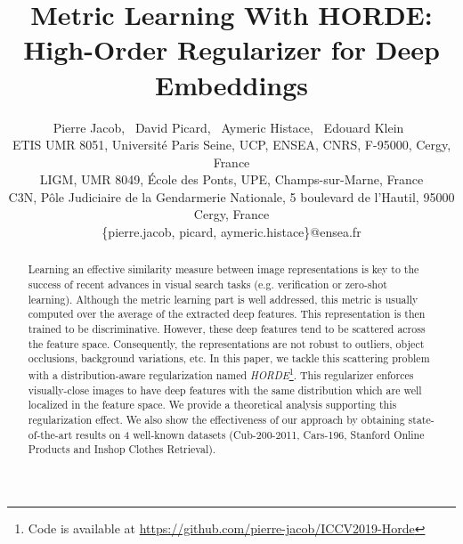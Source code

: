 \documentclass[10pt,twocolumn,letterpaper]{article}
\def\ourmethod{\textit{HORDE}}
\begin{document}
\title{Metric Learning With HORDE: High-Order Regularizer for Deep Embeddings}

\author{Pierre Jacob,~
        David Picard,~
        Aymeric Histace,~
        Edouard Klein~\\
        ETIS UMR 8051, Universit{\'e} Paris Seine, UCP, ENSEA, CNRS, F-95000, Cergy, France \\
        LIGM, UMR 8049, \'Ecole des Ponts, UPE, Champs-sur-Marne, France \\
        C3N, P\^{o}le Judiciaire de la Gendarmerie Nationale, 5 boulevard de l'Hautil, 95000 Cergy, France\\
        \small \{pierre.jacob, picard, aymeric.histace\}@ensea.fr}

\maketitle

\begin{abstract}
Learning an effective similarity measure between image representations is key to the success of recent advances in visual search tasks (e.g. verification or zero-shot learning).
Although the metric learning part is well addressed, this metric is usually computed over the average of the extracted deep features.
This representation is then trained to be discriminative.
However, these deep features tend to be scattered across the feature space.
Consequently, the representations are not robust to outliers, object occlusions, background variations, etc.
In this paper, we tackle this scattering problem with a distribution-aware regularization named \ourmethod\footnote{Code is available at \url{https://github.com/pierre-jacob/ICCV2019-Horde}}.
This regularizer enforces visually-close images to have deep features with the same distribution which are well localized in the feature space.
We provide a theoretical analysis supporting this regularization effect.
We also show the effectiveness of our approach by obtaining state-of-the-art results on 4 well-known datasets (Cub-200-2011, Cars-196, Stanford Online Products and Inshop Clothes Retrieval).

\end{abstract}
\end{document}

